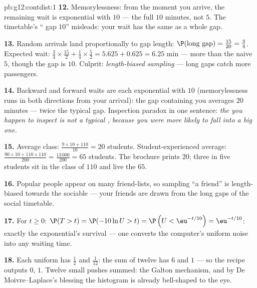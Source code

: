 \begin{solution}{pb:g12:contdist:1}
\textbf{12.} Memorylessness: from the moment you arrive, the
remaining wait is exponential with  $10$ --- the full
$10$ minutes, not $5$. The timetable's `` gap $10$''
misleads: your wait has the same  as a whole gap.

\textbf{13.} Random arrivals land proportionally to gap
length: $\P(\text{long gap}) = \frac{15}{20} = \frac34$.
Expected wait: $\frac34 \times \frac{15}{2} + \frac14 \times
\frac52 = 5.625 + 0.625 = 6.25$ min --- more than the naive
$5$, though the  gap is $10$. Culprit: \emph{length-biased
sampling} --- long gaps catch more passengers.

\textbf{14.} Backward and forward waits are each exponential
with  $10$ (memorylessness runs in both directions from
your arrival): the gap containing you averages $20$ minutes
--- twice the typical gap. Inspection paradox in one sentence:
\emph{the  you happen to inspect is not a typical
, because you were more likely to fall into a big
one.}

\textbf{15.} Average class: $\frac{9 \times 10 + 110}{10} =
20$ students. Student-experienced average:
$\frac{90 \times 10 + 110 \times 110}{200} = \frac{13\,000}
{200} = 65$ students. The brochure prints $20$; three in five
students sit in the class of $110$ and live the $65$.

\textbf{16.} Popular people appear on many friend-lists, so
sampling ``a friend'' is length-biased towards the sociable
--- your friends are drawn from the long gaps of the social
timetable.

\textbf{17.} For $t \geq 0$:
$\P(T > t) = \P(-10\ln U > t) = \P\left(U <
\eu^{-t/10}\right) = \eu^{-t/10}$: exactly the exponential's
survival  --- one  converts the computer's
uniform noise into any waiting time.

\textbf{18.} Each uniform has  $\frac12$ and 
$\frac{1}{12}$: the sum of twelve has  $6$ and 
$1$ --- so the recipe outputs  $0$,  $1$. Twelve
 small pushes summed: the Galton mechanism, and by
De Moivre--Laplace's blessing the histogram is already
bell-shaped to the eye.


\end{solution}
